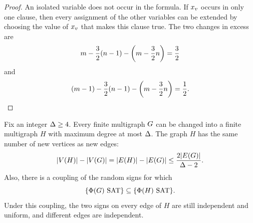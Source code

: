 \begin{proof}
An isolated variable does not occur in the formula. If \(x_{v}\) occurs in
only one clause, then every assignment of the other variables can be extended
by choosing the value of \(x_{v}\) that makes this clause true.
The two changes in excess are
\[
  m-\frac32(n-1)-\left(m-\frac32n\right)=\frac32
\]
and
\[
  (m-1)-\frac32(n-1)-\left(m-\frac32n\right)=\frac12.
\]
\end{proof}

\begin{lemma}\label{lem:splitting}
Fix an integer \(\Delta\ge4\). Every finite multigraph \(G\) can be changed
into a finite multigraph \(H\) with maximum degree at most \(\Delta\). The graph
\(H\) has the same number of new vertices as new edges:
\[
  |V(H)|-|V(G)|
  =|E(H)|-|E(G)|
  \le\frac{2|E(G)|}{\Delta-2}.
\]
Also, there is a coupling of the random signs for which
\[
  \{\Phi(G)\text{ SAT}\}
  \subseteq
  \{\Phi(H)\text{ SAT}\}.
\]
Under this coupling, the two signs on every edge of \(H\) are still
independent and uniform, and different edges are independent.
\end{lemma}

